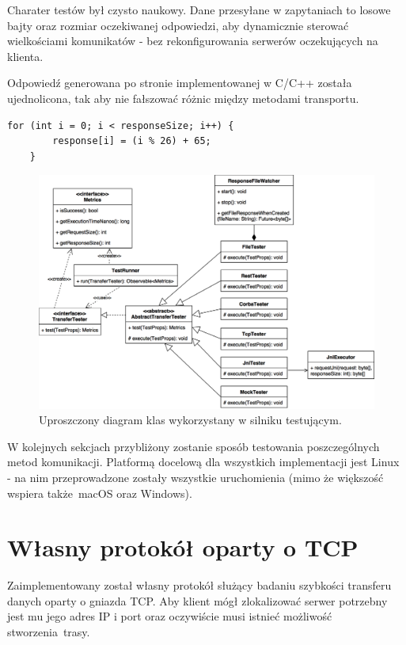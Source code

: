 Charater testów był czysto naukowy. Dane przesyłane w zapytaniach to losowe bajty oraz rozmiar oczekiwanej odpowiedzi, aby dynamicznie sterować wielkościami komunikatów - bez rekonfigurowania serwerów oczekujących na klienta.

Odpowiedź generowana po stronie implementowanej w C/C++ została ujednolicona, tak aby nie fałszować różnic między metodami transportu.

\begin{lstlisting}[caption={Fragment kodu wykorzystywanego w każdej metodzie komunikacji do generowania odpowiedzi},captionpos=b]
    for (int i = 0; i < responseSize; i++) {
        response[i] = (i % 26) + 65;
    }
\end{lstlisting}

\begin{figure}[h!]
	\centering
	\includegraphics[width=\textwidth,height=\textheight,keepaspectratio]{img/class_diagram.png}
	\caption{Uproszczony diagram klas wykorzystany w silniku testującym.}
\end{figure}

W kolejnych sekcjach przybliżony zostanie sposób testowania poszczególnych metod komunikacji. Platformą docelową dla wszystkich implementacji jest Linux - na nim przeprowadzone zostały wszystkie uruchomienia (mimo że większość wspiera także macOS oraz Windows).

\section{Własny protokół oparty o TCP}

Zaimplementowany został własny protokół służący badaniu szybkości transferu danych oparty o gniazda TCP. Aby klient mógł zlokalizować serwer potrzebny jest mu jego adres IP i port oraz oczywiście musi istnieć możliwość stworzenia trasy.


